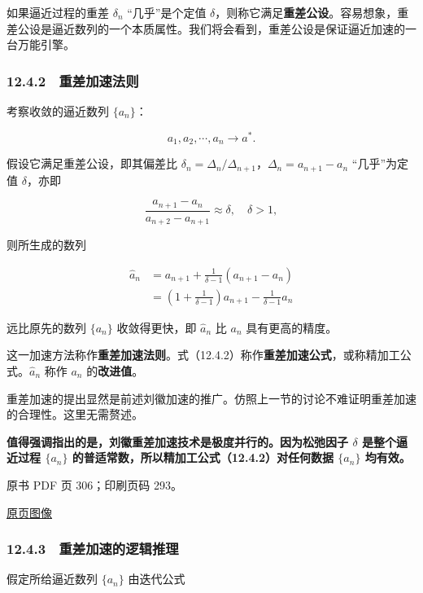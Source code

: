 如果逼近过程的重差 \(\delta_n\) ``几乎''是个定值 \(\delta\)，则称它满足\textbf{重差公设}。容易想象，重差公设是逼近数列的一个本质属性。我们将会看到，重差公设是保证逼近加速的一台万能引擎。

\subsubsection{12.4.2　重差加速法则}\label{ch12-ux91cdux5deeux52a0ux901fux6cd5ux5219}

考察收敛的逼近数列 \(\{a_n\}\)：

\[
a_1,a_2,\cdots,a_n\to a^*.
\]

假设它满足重差公设，即其偏差比 \(\delta_n=\Delta_n/\Delta_{n+1}\)，\(\Delta_n=a_{n+1}-a_n\) ``几乎''为定值 \(\delta\)，亦即

\[
\frac{a_{n+1}-a_n}{a_{n+2}-a_{n+1}}\approx\delta,\quad\delta>1,
\tag{12.4.1}
\]

则所生成的数列

\[
\begin{aligned}
\widehat a_n&=a_{n+1}+\frac{1}{\delta-1}(a_{n+1}-a_n)\\
&=\left(1+\frac{1}{\delta-1}\right)a_{n+1}-\frac{1}{\delta-1}a_n
\end{aligned}
\tag{12.4.2}
\]

远比原先的数列 \(\{a_n\}\) 收敛得更快，即 \(\widehat a_n\) 比 \(a_n\) 具有更高的精度。

这一加速方法称作\textbf{重差加速法则}。式（12.4.2）称作\textbf{重差加速公式}，或称精加工公式。\(\widehat a_n\) 称作 \(a_n\) 的\textbf{改进值}。

重差加速的提出显然是前述刘徽加速的推广。仿照上一节的讨论不难证明重差加速的合理性。这里无需赘述。

\textbf{值得强调指出的是，刘徽重差加速技术是极度并行的。因为松弛因子 \(\delta\) 是整个逼近过程 \(\{a_n\}\) 的普适常数，所以精加工公式（12.4.2）对任何数据 \(\{a_n\}\) 均有效。}

\clearpage

原书 PDF 页 306；印刷页码 293。

\href{source-images/pdf-306.jpeg}{原页图像}

\subsubsection{12.4.3　重差加速的逻辑推理}\label{ch12-ux91cdux5deeux52a0ux901fux7684ux903bux8f91ux63a8ux7406}

假定所给逼近数列 \(\{a_n\}\) 由迭代公式

